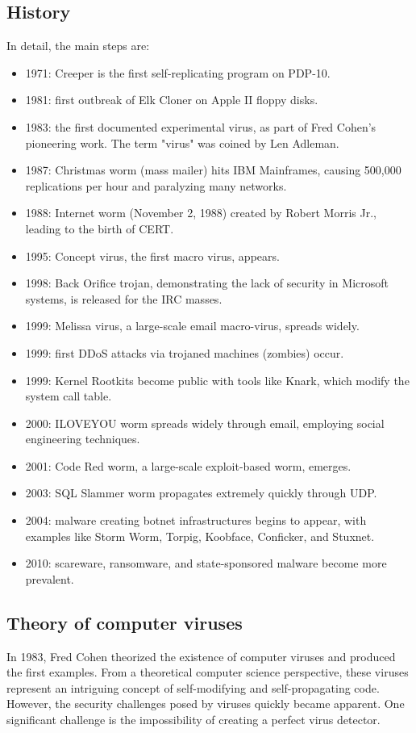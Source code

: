 \subsection{History}
In detail, the main steps are: 
\begin{itemize}
    \item 1971: Creeper is the first self-replicating program on PDP-10.
    \item 1981: first outbreak of Elk Cloner on Apple II floppy disks.
    \item 1983: the first documented experimental virus, as part of Fred Cohen's pioneering work. The term "virus" was coined by Len Adleman.
    \item 1987: Christmas worm (mass mailer) hits IBM Mainframes, causing 500,000 replications per hour and paralyzing many networks.
    \item 1988: Internet worm (November 2, 1988) created by Robert Morris Jr., leading to the birth of CERT.
    \item 1995: Concept virus, the first macro virus, appears.
    \item 1998: Back Orifice trojan, demonstrating the lack of security in Microsoft systems, is released for the IRC masses.
    \item 1999: Melissa virus, a large-scale email macro-virus, spreads widely.
    \item 1999: first DDoS attacks via trojaned machines (zombies) occur.
    \item 1999: Kernel Rootkits become public with tools like Knark, which modify the system call table.
    \item 2000: ILOVEYOU worm spreads widely through email, employing social engineering techniques.
    \item 2001: Code Red worm, a large-scale exploit-based worm, emerges.
    \item 2003: SQL Slammer worm propagates extremely quickly through UDP.
    \item 2004: malware creating botnet infrastructures begins to appear, with examples like Storm Worm, Torpig, Koobface, Conficker, and Stuxnet.
    \item 2010: scareware, ransomware, and state-sponsored malware become more prevalent.
\end{itemize}

\subsection{Theory of computer viruses}
In 1983, Fred Cohen theorized the existence of computer viruses and produced the first examples. 
From a theoretical computer science perspective, these viruses represent an intriguing concept of self-modifying and self-propagating code. 
However, the security challenges posed by viruses quickly became apparent.
One significant challenge is the impossibility of creating a perfect virus detector.

